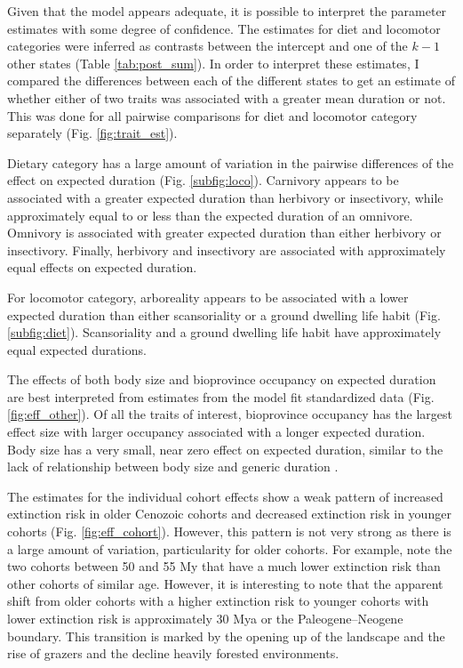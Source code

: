 \documentclass[12pt,letterpaper]{article}
\begin{document}
Given that the model appears adequate, it is possible to interpret the parameter estimates with some degree of confidence. The estimates for diet and locomotor categories were inferred as contrasts between the intercept and one of the \(k - 1\) other states (Table \ref{tab:post_sum}). In order to interpret these estimates, I compared the differences between each of the different states to get an estimate of whether either of two traits was associated with a greater mean duration or not. This was done for all pairwise comparisons for diet and locomotor category separately (Fig. \ref{fig:trait_est}).

Dietary category has a large amount of variation in the pairwise differences of the effect on expected duration (Fig. \ref{subfig:loco}). Carnivory appears to be associated with a greater expected duration than herbivory or insectivory, while approximately equal to or less than the expected duration of an omnivore. Omnivory is associated with greater expected duration than either herbivory or insectivory. Finally, herbivory and insectivory are associated with approximately equal effects on expected duration.

For locomotor category, arboreality appears to be associated with a lower expected duration than either scansoriality or a ground dwelling life habit (Fig. \ref{subfig:diet}). Scansoriality and a ground dwelling life habit have approximately equal expected durations. %

The effects of both body size and bioprovince occupancy on expected duration are best interpreted from estimates from the model fit standardized data (Fig. \ref{fig:eff_other}). Of all the traits of interest, bioprovince occupancy has the largest effect size with larger occupancy associated with a longer expected duration. Body size has a very small, near zero effect on expected duration, similar to the lack of relationship between body size and generic duration \citep{Tomiya2013}.

The estimates for the individual cohort effects show a weak pattern of increased extinction risk in older Cenozoic cohorts and decreased extinction risk in younger cohorts (Fig. \ref{fig:eff_cohort}). However, this pattern is not very strong as there is a large amount of variation, particularity for older cohorts. For example, note the two cohorts between 50 and 55 My that have a much lower extinction risk than other cohorts of similar age. However, it is interesting to note that the apparent shift from older cohorts with a higher extinction risk to younger cohorts with lower extinction risk is approximately 30 Mya or the Paleogene--Neogene boundary. This transition is marked by the opening up of the landscape and the rise of grazers and the decline heavily forested environments.
\end{document}
